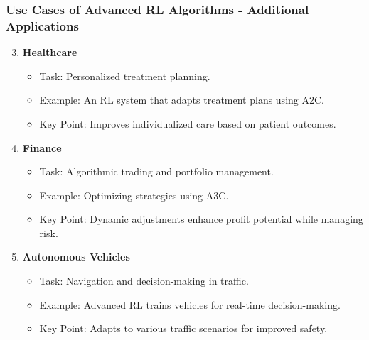 \documentclass{beamer}
\begin{document}
\begin{frame}[fragile]
    \frametitle{Use Cases of Advanced RL Algorithms - Additional Applications}
    \begin{enumerate}
        \setcounter{enumi}{2} %
        \item \textbf{Healthcare}
            \begin{itemize}
                \item Task: Personalized treatment planning.
                \item Example: An RL system that adapts treatment plans using A2C.
                \item Key Point: Improves individualized care based on patient outcomes.
            \end{itemize}

        \item \textbf{Finance}
            \begin{itemize}
                \item Task: Algorithmic trading and portfolio management.
                \item Example: Optimizing strategies using A3C.
                \item Key Point: Dynamic adjustments enhance profit potential while managing risk.
            \end{itemize}

        \item \textbf{Autonomous Vehicles}
            \begin{itemize}
                \item Task: Navigation and decision-making in traffic.
                \item Example: Advanced RL trains vehicles for real-time decision-making.
                \item Key Point: Adapts to various traffic scenarios for improved safety.
            \end{itemize}
    \end{enumerate}
\end{frame}
\end{document}
